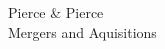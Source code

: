 \begin{raggedright}
\hfill\large{ Pierce \& Pierce \\ }
\vspace{-3pt}
\hfill\scriptsize{Mergers and Aquisitions}
\end{raggedright}